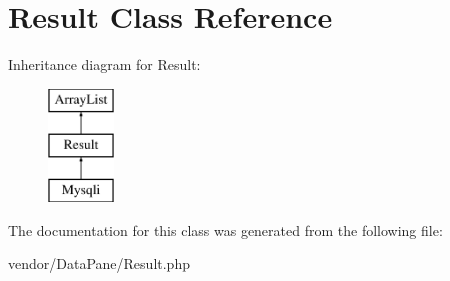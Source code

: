 \hypertarget{classResult}{
\section{Result Class Reference}
\label{classResult}
}
Inheritance diagram for Result:\begin{figure}[H]
\begin{center}
\leavevmode
\includegraphics[height=3.000000cm]{classResult}
\end{center}
\end{figure}


The documentation for this class was generated from the following file:\begin{DoxyCompactItemize}
\item 
vendor/DataPane/Result.php\end{DoxyCompactItemize}
